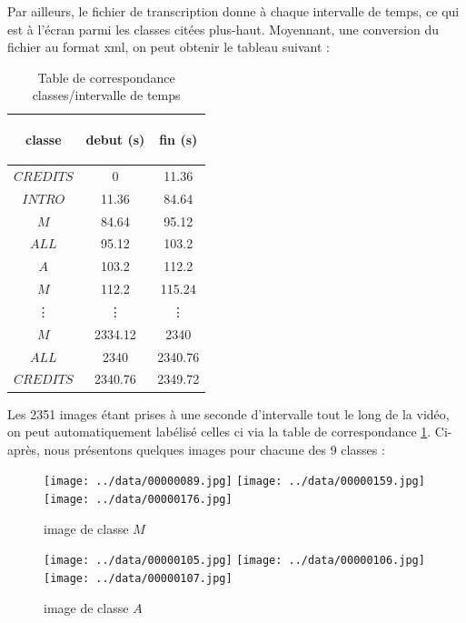 \documentclass{book}
\begin{document}
Par ailleurs, le fichier de transcription donne à chaque intervalle de temps, ce qui est à l'écran parmi les classes citées plus-haut. Moyennant, une conversion du fichier au format xml, on peut obtenir
le tableau suivant :

\begin{table}[H]
\begin{center}
\begin{tabular}{|c|c|c|}
\hline
\begin{bf}classe\end{bf} & \begin{bf}debut (s)\end{bf} & \begin{bf}fin (s)\end{bf} \\
\hline
$CREDITS$	& 0 & 11.36 \\
\hline
$INTRO$   & 11.36	& 84.64 \\
\hline
$M$	& 84.64	& 95.12 \\
\hline
$ALL$	& 95.12	& 103.2 \\
\hline
$A$	& 103.2	& 112.2 \\
\hline
$M$	& 112.2	& 115.24 \\
\hline
\vdots & \vdots &\vdots \\
\hline
$M$	& 2334.12 & 2340 \\
\hline
$ALL$	& 2340 & 2340.76 \\
\hline
$CREDITS$	& 2340.76 & 2349.72 \\
\hline
\end{tabular}
\end{center}
\caption{Table de correspondance classes/intervalle de temps}
\label{Table correspondance classe/temps}
\end{table}
\clearpage

Les 2351 images étant prises à une seconde d'intervalle tout le long de la vidéo, on peut automatiquement labélisé celles ci via la table de
correspondance \ref{Table correspondance classe/temps}.
Ci-après, nous présentons quelques images pour chacune des 9 classes :
\begin{figure}[H]
\begin{center}
\texttt{[image: ../data/00000089.jpg]}
\texttt{[image: ../data/00000159.jpg]}
\texttt{[image: ../data/00000176.jpg]}
\end{center}
\caption{image de classe $M$}
\label{classeM}
\end{figure}

\begin{figure}[H]
\begin{center}
\texttt{[image: ../data/00000105.jpg]}
\texttt{[image: ../data/00000106.jpg]}
\texttt{[image: ../data/00000107.jpg]}
\end{center}
\caption{image de classe $A$}
\label{classeA}
\end{figure}
\end{document}
